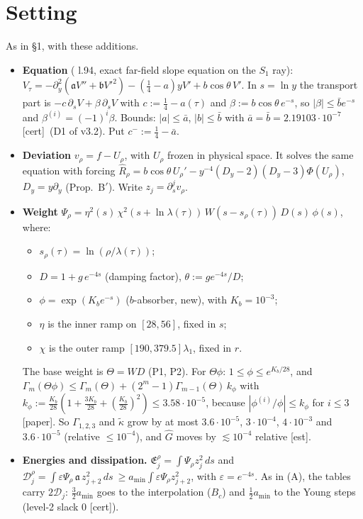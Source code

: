 \documentclass[11pt]{article}
\theoremstyle{remark}\newtheorem{remark}[theorem]{Remark}
\newcommand{\fn}[1]{\texttt{\detokenize{#1}}}
\newcommand{\tC}{\textup{[cert]}}\newcommand{\tE}{\textup{[est]}}\newcommand{\tP}{\textup{[paper]}}\newcommand{\tR}{\textup{[rev]}}
\newcommand{\E}{\mathfrak E}\newcommand{\B}{\mathfrak B}
\begin{document}
\section{Setting}\label{sec:set}
As in \fn{launch_lemma.tex} \S1, with these additions.
\begin{itemize}[leftmargin=*,itemsep=2pt]
\item \textbf{Equation} (\fn{lemmaS.tex} l.94, exact far-field slope equation on the $S_1$ ray): $V_\tau=-\partial_y^2(\mathfrak aV''+\mathfrak bV'^2)-(\tfrac14-a)yV'+b\cos\theta\,V'$. In $s=\ln y$ the transport part is $-c\,\partial_sV+\beta\,\partial_sV$ with $c:=\tfrac14-a(\tau)$ and $\beta:=b\cos\theta\,e^{-s}$, so $|\beta|\le\bar b e^{-s}$ and $\beta^{(i)}=(-1)^i\beta$. Bounds: $|a|\le\bar a$, $|b|\le\bar b$ with $\bar a=\bar b=2.19103\cdot10^{-7}$ \tC\ (D1 of v3.2). Put $c^-:=\tfrac14-\bar a$.
\item \textbf{Deviation} $v_\rho=f-U_\rho$, with $U_\rho$ frozen in physical space. It solves the same equation with forcing $\hat R_\rho=b\cos\theta\,U_\rho'-y^{-4}(D_y-2)(D_y-3)\Phi(U_\rho)$, $D_y=y\partial_y$ (Prop.~B$'$). Write $z_j=\partial_s^jv_\rho$.
\item \textbf{Weight} $\Psi_\rho=\eta^2(s)\,\chi^2(s+\ln\lambda(\tau))\,W(s-s_\rho(\tau))\,D(s)\,\phi(s)$, where:
  \begin{itemize}[itemsep=0pt]
  \item $s_\rho(\tau)=\ln(\rho/\lambda(\tau))$;
  \item $D=1+g\,e^{-4s}$ (damping factor), $\theta:=ge^{-4s}/D$;
  \item $\phi=\exp(K_be^{-s})$ ($b$-absorber, new), with $K_b=10^{-3}$;
  \item $\eta$ is the inner ramp on $[28,56]$, fixed in $s$;
  \item $\chi$ is the outer ramp $[190,379.5]\lambda_1$, fixed in $r$.
  \end{itemize}
  The base weight is $\Theta=WD$ (P1, P2). For $\Theta\phi$: $1\le\phi\le e^{K_b/28}$, and $\Gamma_m(\Theta\phi)\le\Gamma_m(\Theta)+(2^m-1)\Gamma_{m-1}(\Theta)\,k_\phi$ with $k_\phi:=\frac{K_b}{28}(1+\frac{3K_b}{28}+(\frac{K_b}{28})^2)\le3.58\cdot10^{-5}$, because $|\phi^{(i)}/\phi|\le k_\phi$ for $i\le3$ \tP. So $\Gamma_{1,2,3}$ and $\tilde\kappa$ grow by at most $3.6\cdot10^{-5}$, $3\cdot10^{-4}$, $4\cdot10^{-3}$ and $3.6\cdot10^{-5}$ (relative $\le10^{-4}$), and $\hat G$ moves by $\lesssim10^{-4}$ relative \tE.
\item \textbf{Energies and dissipation.} $\E_j^\rho=\int\Psi_\rho z_j^2\,ds$ and $\mathcal D_j^\rho=\int\varepsilon\Psi_\rho\,\mathfrak a\,z_{j+2}^2\,ds\ \ge a_{\min}\int\varepsilon\Psi_\rho z_{j+2}^2$, with $\varepsilon=e^{-4s}$. As in (A), the tables carry $2\mathcal D_j$: $\tfrac32a_{\min}$ goes to the interpolation ($B_c$) and $\tfrac12a_{\min}$ to the Young steps (level-2 slack $0$ \tC).

\end{itemize}
\end{document}
